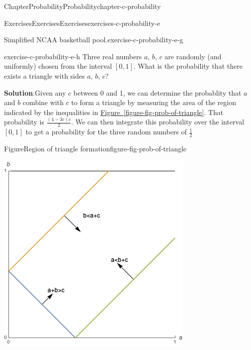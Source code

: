 \documentclass[oneside,10pt,]{book}
\newcommand{\blocktitlefont}{\relax}
\newcommand{\xreffont}{\relax}
\numberwithin{equation}{section}
\begin{document}
\begin{chapterptx}{Chapter}{Probability}{}{Probability}{}{}{chapter-c-probability}
\begin{exercises-section}{Exercises}{Exercises}{}{Exercises}{}{}{exercises-c-probability-e}
\begin{divisionexercise}{6}{Simplified NCAA basketball pool.}{}{exercise-c-probability-e-g}
\end{divisionexercise}%
\begin{divisionexercise}{7}{}{}{exercise-c-probability-e-h}%
Three real numbers \(a\), \(b\), \(c\) are randomly (and uniformly) chosen from the interval \([0, 1]\). What is the probability that there exists a triangle with sides \(a\), \(b\), \(c\)?%
\par\smallskip%
\noindent\textbf{\blocktitlefont Solution}.\hypertarget{solution-c-probability-e-h-b}{}\quad{}Given any \(c\) between 0 and 1, we can determine the probablity that \(a\) and \(b\) combine with \(c\) to form a triangle by measuring the area of the region indicated by the inequalities in \hyperref[figure-fig-prob-of-triangle]{Figure~{\xreffont\ref{figure-fig-prob-of-triangle}}}. That probability is \(\frac{(4-3c)c}{2}\). We can then integrate this probability over the interval \([0,1]\) to get a probability for the three random numbers of \(\frac{1}{2}\)%
\begin{figureptx}{Figure}{Region of triangle formation}{figure-fig-prob-of-triangle}{}%
\begin{image}{0}{1}{0}%
\includegraphics[width=\linewidth]{images/prob-of-triangle.png}
\end{image}%
\tcblower
\end{figureptx}%

\end{divisionexercise}
\end{exercises-section}
\end{chapterptx}
\end{document}
